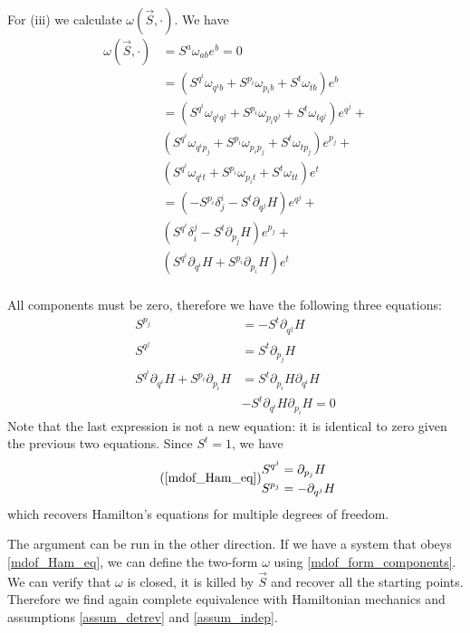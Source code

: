 \documentclass[fleqn,10pt]{wlscirep}
\begin{document}
For (iii) we calculate $\omega(\vec{S}, \cdot ) $. We have
\begin{equation}
\begin{aligned}
	\omega(\vec{S}, \cdot )  &= S^a \omega_{ab} e^b = 0 \\
	&= (S^{q^i}\omega_{q^ib} + S^{p_i}\omega_{p_ib} + S^{t}\omega_{tb}) e^b \\
	&= (S^{q^i}\omega_{q^iq^j} + S^{p_i}\omega_{p_iq^j} + S^{t}\omega_{tq^j}) e^{q^j} + \\
	& (S^{q^i}\omega_{q^ip_j} +  S^{p_i}\omega_{p_ip_j} + S^{t}\omega_{tp_j}) e^{p_j} + \\
	& (S^{q^i}\omega_{q^it} + S^{p_i}\omega_{p_it} + S^{t}\omega_{tt}) e^t \\
	&= (-S^{p_i}\delta^i_j - S^{t}\partial_{q^j} H ) e^{q^j} + \\
	& (S^{q^i}\delta^j_i -  S^{t}\partial_{p_j} H) e^{p_j} + \\
	& (S^{q^i} \partial_{q^i} H + S^{p_i} \partial_{p_i} H) e^t \\
\end{aligned}
\end{equation}

All components must be zero, therefore we have the following three equations:
\begin{equation}
\begin{aligned}
	S^{p_j} &= - S^{t} \partial_{q^j} H \\
	S^{q^j} &= S^{t}\partial_{p_j} H \\
	S^{q^i} \partial_{q^i} H + S^{p_i} \partial_{p_i} H &= S^{t}\partial_{p_i} H \partial_{q^i} H \\
	& - S^{t} \partial_{q^i} H \partial_{p_i} H = 0
\end{aligned}
\end{equation}
Note that the last expression is not a new equation: it is identical to zero given the previous two equations. Since $S^t = 1$, we have
\begin{equation}
	\tag*{(\ref{mdof_Ham_eq})}
\begin{aligned}
	S^{q^j} &= \partial_{p_j} H \\
	S^{p_j} &= - \partial_{q^j} H 
\end{aligned}
\end{equation}
which recovers Hamilton's equations for multiple degrees of freedom.

The argument can be run in the other direction. If we have a system that obeys \ref{mdof_Ham_eq}, we can define the two-form $\omega$ using \ref{mdof_form_components}. We can verify that $\omega$ is closed, it is killed by $\vec{S}$ and recover all the starting points. Therefore we find again complete equivalence with Hamiltonian mechanics and assumptions \ref{assum_detrev} and \ref{assum_indep}.
\end{document}
